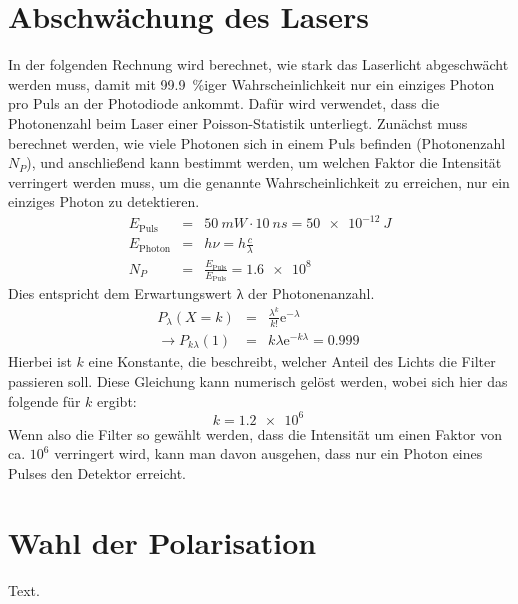 \appendix
\section{Abschwächung des Lasers}
\label{sec:laser}
In der folgenden Rechnung wird berechnet, wie stark das Laserlicht abgeschwächt
werden muss, damit mit \SI{99,9}{\percent}iger Wahrscheinlichkeit nur ein
einziges Photon pro Puls an der Photodiode ankommt. Dafür wird verwendet, dass
die Photonenzahl beim Laser einer Poisson-Statistik unterliegt. Zunächst muss
berechnet werden, wie viele Photonen sich in einem Puls befinden (Photonenzahl
$N_P$), und anschließend kann bestimmt werden, um welchen Faktor die Intensität
verringert werden muss, um die genannte Wahrscheinlichkeit zu erreichen, nur ein
einziges Photon zu detektieren.
\begin{eqnarray}
E_{\mathrm{Puls}} &=& \SI{50}{mW}\cdot\SI{10}{ns} = \SI{50e-12}{J}\\
E_{\mathrm{Photon}} &=& hν = h\frac{c}{λ}\\
N_P &=& \frac{E_{\mathrm{Puls}}}{E_{\mathrm{Puls}}} = \SI{1,6e8}{}
\end{eqnarray}
Dies entspricht dem Erwartungswert λ der Photonenanzahl.
\begin{eqnarray}
P_λ(X=k) &=& \frac{λ^k}{k!}\mathrm{e}^{-λ}\\
\rightarrow P_{kλ}(1) &=& kλ\mathrm{e}^{-kλ} = \SI{0.999}{}
\end{eqnarray}
Hierbei ist $k$ eine Konstante, die beschreibt, welcher Anteil des Lichts die
Filter passieren soll. Diese Gleichung kann numerisch gelöst werden, wobei sich
hier das folgende für $k$ ergibt:
\begin{equation}
k = \SI{1.2e6}{}
\end{equation}
Wenn also die Filter so gewählt werden, dass die Intensität um einen Faktor von
ca. $10^6$ verringert wird, kann man davon ausgehen, dass nur ein Photon eines
Pulses den Detektor erreicht.

\section{Wahl der Polarisation}
\label{sec:zirkular}
Text.

\onecolumn
